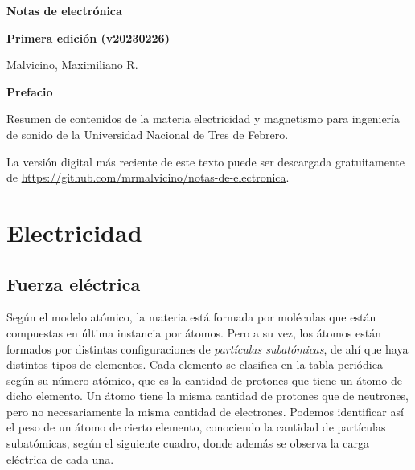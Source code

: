 \documentclass[a5paper,12pt,twoside]{book}
\begin{document}
\pagestyle{fancy}
\fancyhf{}
\chead{\scriptsize \nouppercase\rightmark}
\cfoot{\scriptsize \thepage}
\renewcommand{\headrulewidth}{0pt}

\frontmatter
% 

\begin{center}
    \begin{Huge}
        \textbf{Notas de electrónica}
    \end{Huge}

    \vspace{1cm}
    \textbf{Primera edición (v20230226)}
    \vspace{2cm}

    \begin{Large}
        Malvicino, Maximiliano R.
    \end{Large}
\end{center}

\clearpage
\noindent
\textbf{Prefacio}

Resumen de contenidos de la materia electricidad y magnetismo para ingeniería de sonido de la Universidad Nacional de Tres de Febrero.

La versión digital más reciente de este texto puede ser descargada gratuitamente de \url{https://github.com/mrmalvicino/notas-de-electronica}.

\renewcommand{\spanishappendixname}{Anexo}
\tableofcontents

\mainmatter
{}


\chapter{Electricidad}


\section{Fuerza eléctrica}

Según el modelo atómico, la materia está formada por moléculas que están compuestas en última instancia por átomos. Pero a su vez, los átomos están formados por distintas configuraciones de \emph{partículas subatómicas}, de ahí que haya distintos tipos de elementos. Cada elemento se clasifica en la tabla periódica según su número atómico, que es la cantidad de protones que tiene un átomo de dicho elemento. Un átomo tiene la misma cantidad de protones que de neutrones, pero no necesariamente la misma cantidad de electrones. Podemos identificar así el peso de un átomo de cierto elemento, conociendo la cantidad de partículas subatómicas, según el siguiente cuadro, donde además se observa la carga eléctrica de cada una.
\end{document}
